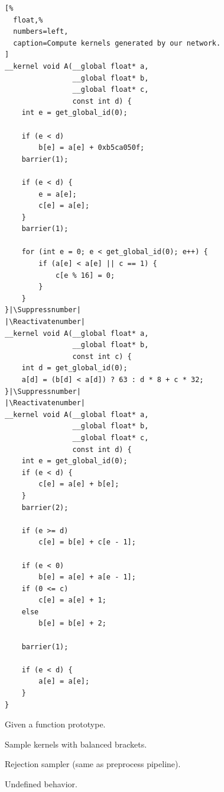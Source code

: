 \documentclass[preprint,nonatbib,10pt,nocopyrightspace]{sigplanconf}
\makeatletter
\let\origthelstnumber\thelstnumber
\newcommand*\Suppressnumber{%
  \lst@AddToHook{OnNewLine}{%
    \let\thelstnumber\relax%
     \advance\c@lstnumber-\@ne\relax%
    }%
}
\newcommand*\Reactivatenumber{%
  \lst@AddToHook{OnNewLine}{%
   \let\thelstnumber\origthelstnumber%
   \advance\c@lstnumber\@ne\relax}%
}
\makeatother
\begin{document}
\lstset{language=[OpenCL]C}
\begin{lstlisting}[%
  float,%
  numbers=left,
  caption=Compute kernels generated by our network.
]
__kernel void A(__global float* a,
                __global float* b,
                __global float* c,
                const int d) {
    int e = get_global_id(0);

    if (e < d)
        b[e] = a[e] + 0xb5ca050f;
    barrier(1);

    if (e < d) {
        e = a[e];
        c[e] = a[e];
    }
    barrier(1);

    for (int e = 0; e < get_global_id(0); e++) {
        if (a[e] < a[e] || c == 1) {
            c[e % 16] = 0;
        }
    }
}|\Suppressnumber|
|\Reactivatenumber|
__kernel void A(__global float* a,
                __global float* b,
                const int c) {
    int d = get_global_id(0);
    a[d] = (b[d] < a[d]) ? 63 : d * 8 + c * 32;
}|\Suppressnumber|
|\Reactivatenumber|
__kernel void A(__global float* a,
                __global float* b,
                __global float* c,
                const int d) {
    int e = get_global_id(0);
    if (e < d) {
        c[e] = a[e] + b[e];
    }
    barrier(2);

    if (e >= d)
        c[e] = b[e] + c[e - 1];

    if (e < 0)
        b[e] = a[e] + a[e - 1];
    if (0 <= c)
        c[e] = a[e] + 1;
    else
        b[e] = b[e] + 2;

    barrier(1);

    if (e < d) {
        a[e] = a[e];
    }
}
\end{lstlisting}


Given a function prototype.

Sample kernels with balanced brackets.

Rejection sampler (same as preprocess pipeline).

Undefined behavior.
\end{document}
